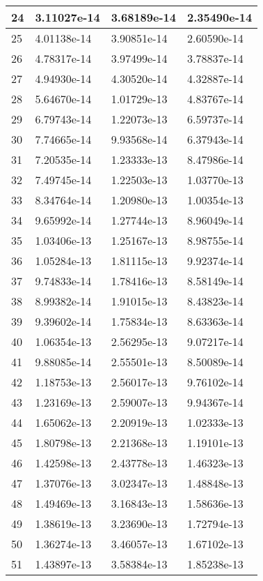 \documentclass{article}
\begin{document}
\begin{table}[H]
{\begin{tabular}{|l|l|l|l|}
24 & 3.11027e-14 & 3.68189e-14 & 2.35490e-14 \\ \hline
25 & 4.01138e-14 & 3.90851e-14 & 2.60590e-14 \\ \hline
26 & 4.78317e-14 & 3.97499e-14 & 3.78837e-14 \\ \hline
27 & 4.94930e-14 & 4.30520e-14 & 4.32887e-14 \\ \hline
28 & 5.64670e-14 & 1.01729e-13 & 4.83767e-14 \\ \hline
29 & 6.79743e-14 & 1.22073e-13 & 6.59737e-14 \\ \hline
30 & 7.74665e-14 & 9.93568e-14 & 6.37943e-14 \\ \hline
31 & 7.20535e-14 & 1.23333e-13 & 8.47986e-14 \\ \hline
32 & 7.49745e-14 & 1.22503e-13 & 1.03770e-13 \\ \hline
33 & 8.34764e-14 & 1.20980e-13 & 1.00354e-13 \\ \hline
34 & 9.65992e-14 & 1.27744e-13 & 8.96049e-14 \\ \hline
35 & 1.03406e-13 & 1.25167e-13 & 8.98755e-14 \\ \hline
36 & 1.05284e-13 & 1.81115e-13 & 9.92374e-14 \\ \hline
37 & 9.74833e-14 & 1.78416e-13 & 8.58149e-14 \\ \hline
38 & 8.99382e-14 & 1.91015e-13 & 8.43823e-14 \\ \hline
39 & 9.39602e-14 & 1.75834e-13 & 8.63363e-14 \\ \hline
40 & 1.06354e-13 & 2.56295e-13 & 9.07217e-14 \\ \hline
41 & 9.88085e-14 & 2.55501e-13 & 8.50089e-14 \\ \hline
42 & 1.18753e-13 & 2.56017e-13 & 9.76102e-14 \\ \hline
43 & 1.23169e-13 & 2.59007e-13 & 9.94367e-14 \\ \hline
44 & 1.65062e-13 & 2.20919e-13 & 1.02333e-13 \\ \hline
45 & 1.80798e-13 & 2.21368e-13 & 1.19101e-13 \\ \hline
46 & 1.42598e-13 & 2.43778e-13 & 1.46323e-13 \\ \hline
47 & 1.37076e-13 & 3.02347e-13 & 1.48848e-13 \\ \hline
48 & 1.49469e-13 & 3.16843e-13 & 1.58636e-13 \\ \hline
49 & 1.38619e-13 & 3.23690e-13 & 1.72794e-13 \\ \hline
50 & 1.36274e-13 & 3.46057e-13 & 1.67102e-13 \\ \hline
51 & 1.43897e-13 & 3.58384e-13 & 1.85238e-13 \\ \hline

\end{tabular}}
\end{table}
\end{document}
